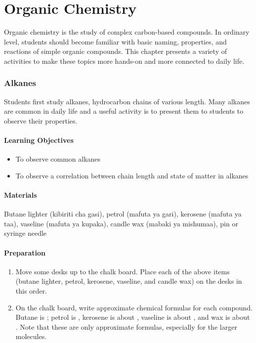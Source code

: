 \chapter{Organic Chemistry}

Organic chemistry is the study of complex carbon-based compounds. In ordinary level, students should become familiar with basic naming, properties, and reactions of simple organic compounds. This chapter presents a variety of activities to make these topics more hands-on and more connected to daily life.

\subsection{Alkanes}

Students first study alkanes, hydrocarbon chains of various length. Many alkanes are common in daily life and a useful activity is to present them to students to observe their properties.

\subsubsection*{Learning Objectives}
\begin{itemize}
\item{To observe common alkanes}
\item{To observe a correlation between chain length and state of matter in alkanes}
\end{itemize}

\subsubsection*{Materials}
Butane lighter (kibiriti cha gasi), petrol (mafuta ya gari), kerosene (mafuta ya taa), vaseline (mafuta ya kupaka), candle wax (mabaki ya mishumaa), pin or syringe needle

\subsubsection*{Preparation}
\begin{enumerate}
\item{Move some desks up to the chalk board. Place each of the above items (butane lighter, petrol, kerosene, vaseline, and candle wax) on the desks in this order.}
\item{On the chalk board, write approximate chemical formulas for each compound. Butane is ; petrol is , kerosene is about , vaseline is about , and wax is about . Note that these are only approximate formulas, especially for the larger molecules.}
\end{enumerate}

